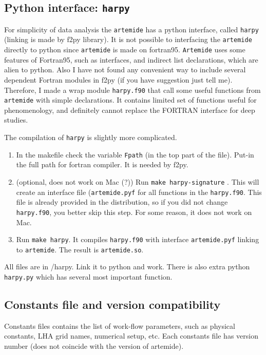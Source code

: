 \documentclass[prd,nofootinbib,eqsecnum,final]{revtex4}
\renewcommand{\(}{\left(}
\renewcommand{\)}{\right)}
\renewcommand{\[}{\left[}
\renewcommand{\]}{\right]}
\begin{document}
\subsection{Python interface: \texttt{harpy}}

For simplicity of data analysis the \texttt{artemide} has a python interface, called \texttt{harpy} (linking is made by f2py library). It is not possible to interfacing the \texttt{artemide} directly  to python since \texttt{artemide} is made on fortran95. \texttt{Artemide} uses some features of Fortran95, such as interfaces, and indirect list declarations, which are alien to python. Also I have not found any convenient way to include several dependent Fortran modules in f2py (if you have suggestion just tell me). Therefore, I made a wrap module \texttt{harpy.f90} that call some useful functions from \texttt{artemide} with simple declarations. It contains limited set of functions useful for phenomenology, and definitely cannot replace the FORTRAN interface for deep studies.

The compilation of \texttt{harpy} is slightly more complicated.

\begin{enumerate}
\item In the makefile check the variable \texttt{Fpath} (in the top part of the file). Put-in the full path for fortran compiler. It is needed by f2py.
\item (optional, does not work on Mac (?)) Run \texttt{make harpy-signature} . This will create an interface file (\texttt{artemide.pyf} for all functions in the \texttt{harpy.f90}. This file is already provided in the distribution, so if you did not change \texttt{harpy.f90}, you better skip this step. For some reason, it does not work on Mac.
\item Run \texttt{make harpy}. It compiles \texttt{harpy.f90} with interface \texttt{artemide.pyf} linking to \texttt{artemide}. The result is \texttt{artemide.so}.
\end{enumerate}

All files are in /harpy. Link it to python and work. There is also extra python \texttt{harpy.py} which has several most important function.

\subsection{Constants file and version compatibility}

Constants files contains the list of work-flow parameters, such as physical constants, LHA grid names, numerical setup, etc. Each constants file has version number (does not coincide with the version of artemide). 
\end{document}
